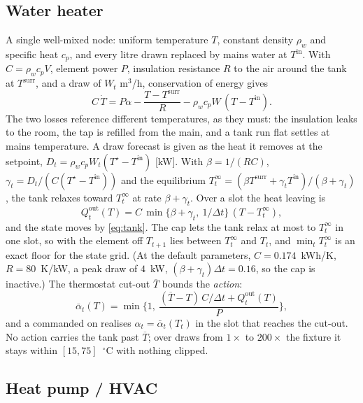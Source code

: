 \documentclass[11pt,a4paper]{article}
\newcommand{\dt}{\Delta t}
\begin{document}
\subsection{Water heater}
\label{app:tank}

A single well-mixed node: uniform temperature $T$, constant density $\rho_w$ and
specific heat $c_p$, and every litre drawn replaced by mains water at
$T^{\mathrm{in}}$. With $C = \rho_w c_p V$, element power $P$, insulation
resistance $R$ to the air around the tank at $T^{\mathrm{surr}}$, and a draw of
$W_t$ m$^3$/h, conservation of energy gives
\begin{equation}
  C\,\dot T = P\alpha - \frac{T - T^{\mathrm{surr}}}{R} - \rho_w c_p W\,(T - T^{\mathrm{in}}).
  \label{eq:tankode}
\end{equation}
The two losses reference different temperatures, as they must: the insulation
leaks to the room, the tap is refilled from the main, and a tank run flat
settles at mains temperature. A draw forecast is given as the heat it removes at
the setpoint, $D_t = \rho_w c_p W_t (T^\star - T^{\mathrm{in}})$ [kW]. With
$\beta = 1/(RC)$, $\gamma_t = D_t/(C(T^\star - T^{\mathrm{in}}))$ and the
equilibrium $T^\infty_t = (\beta T^{\mathrm{surr}} + \gamma_t T^{\mathrm{in}})/(\beta
+ \gamma_t)$, the tank relaxes toward $T^\infty_t$ at rate $\beta + \gamma_t$.
Over a slot the heat leaving is
\begin{equation}
  Q^{\mathrm{out}}_t(T) = C\,\min\{\beta + \gamma_t,\ 1/\dt\}\,(T - T^\infty_t),
  \label{eq:outflow}
\end{equation}
and the state moves by \eqref{eq:tank}. The cap lets the tank relax at most to
$T^\infty_t$ in one slot, so with the element off $T_{t+1}$ lies between
$T^\infty_t$ and $T_t$, and $\min_t T^\infty_t$ is an exact floor for the state
grid. (At the default parameters, $C = 0.174$~kWh/K, $R = 80$~K/kW, a peak draw of
$4$~kW, $(\beta + \gamma_t)\dt = 0.16$, so the cap is inactive.) The thermostat
cut-out $\overline T$ bounds the \emph{action}:
\begin{equation}
  \bar\alpha_t(T) = \min\Big\{1,\ \frac{(\overline T - T)\,C/\dt + Q^{\mathrm{out}}_t(T)}{P}\Big\},
  \label{eq:duty}
\end{equation}
and a commanded on realises $\alpha_t = \bar\alpha_t(T_t)$ in the slot that
reaches the cut-out. No action carries the tank past $\overline T$; over draws
from $1\times$ to $200\times$ the fixture it stays within $[15, 75]$~$^\circ$C
with nothing clipped.

\subsection{Heat pump / HVAC}
\label{app:hvac}
\end{document}
